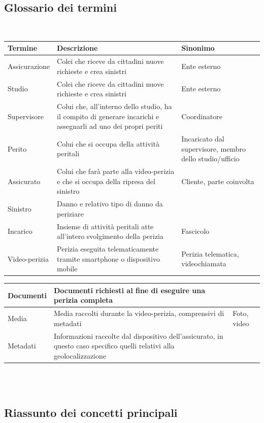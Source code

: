 \documentclass[a4paper,12pt]{report}
\begin{document}
\subsection{Glossario dei termini}
\mbox{}\\
\def\arraystretch{2}%
\begin{tabularx}{\textwidth}{ m{3cm} | m{6cm} | m{3cm}}
    \textbf{Termine} & \textbf{Descrizione} & \textbf{Sinonimo} \\
\hline
Assicurazione & Colei che riceve da cittadini nuove richieste e crea sinistri & Ente esterno\\ \hline
Studio & Colei che riceve da cittadini nuove richieste e crea sinistri & Ente esterno\\ \hline
Supervisore & Colui che, all’interno dello studio, ha il compito di generare incarichi e assegnarli ad uno dei propri periti & Coordinatore\\ \hline
Perito & Colui che si occupa della attività peritali & Incaricato dal supervisore, membro dello studio/ufficio\\ \hline
Assicurato & Colui che farà parte alla video-perizia e che si occupa della ripresa del sinistro & Cliente, parte coinvolta\\ \hline
Sinistro & Danno e relativo tipo di danno da periziare & \\ \hline
Incarico & Insieme di attività peritali atte all’intero svolgimento della perizia & Fascicolo\\ \hline
Video-perizia & Perizia eseguita telematicamente tramite smartphone o dispositivo mobile & Perizia telematica, videochiamata
\\ 

\end{tabularx}
\noindent
\def\arraystretch{2}%
\begin{tabularx}{\textwidth}{ m{3cm} | m{6cm} | m{3cm}}
Documenti & Documenti richiesti al fine di eseguire una perizia completa & \\ \hline
Media & Media raccolti durante la video-perizia, comprensivi di metadati & Foto, video\\ \hline
Metadati & Informazioni raccolte dal dispositivo dell’assicurato, in questo caso specifico quelli relativi alla geolocalizzazione & \\
\end{tabularx}
\\
\\

\subsection{Riassunto dei concetti principali}
\end{document}
